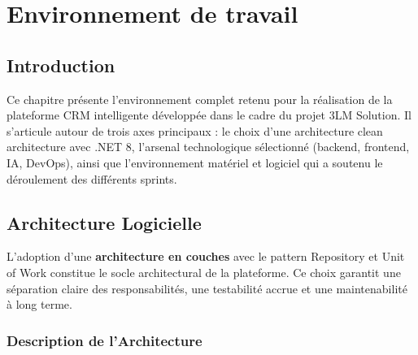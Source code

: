 
\chapter{Environnement de travail}

\section*{Introduction}
\label{sec:chap3_introduction}

\noindent Ce chapitre présente l'environnement complet retenu pour la réalisation de la
plateforme CRM intelligente développée dans le cadre du projet 3LM Solution.
Il s'articule autour de trois axes principaux : le choix d'une architecture clean architecture
avec .NET 8, l'arsenal technologique sélectionné (backend, frontend, IA, DevOps), ainsi que
l'environnement matériel et logiciel qui a soutenu le déroulement des différents sprints.

\section{Architecture Logicielle}
\label{sec:chap3_architecture_logicielle}

\noindent L'adoption d'une \textbf{architecture en couches} avec le pattern Repository et
Unit of Work constitue le socle architectural de la plateforme. Ce choix garantit une
séparation claire des responsabilités, une testabilité accrue et une maintenabilité à long
terme.

\subsection{Description de l'Architecture}

